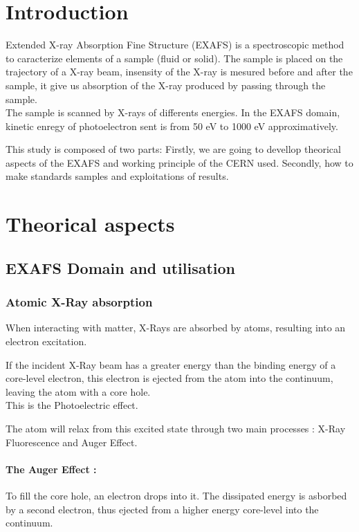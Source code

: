 \documentclass[11pt,a4paper,oneside]{article}
\begin{document}


\section*{Introduction}

Extended X-ray Absorption Fine Structure (EXAFS) is a spectroscopic method to caracterize elements of a sample (fluid or solid). The sample is placed on the trajectory of a X-ray beam, insensity of the X-ray is mesured before and after the sample, it give us absorption of the X-ray produced by passing through the sample.\\
The sample is scanned by X-rays of differents energies. In the EXAFS domain, kinetic enregy of photoelectron sent is from 50 eV to 1000 eV approximatively.

This study is composed of two parts: Firstly, we are going to devellop theorical aspects of the EXAFS and working principle of the CERN used. Secondly, how to make standards samples and exploitations of results.




\newpage

\section{Theorical aspects}
\subsection{EXAFS Domain and utilisation}
\subsubsection{Atomic X-Ray absorption}
When interacting with matter, X-Rays are absorbed by atoms, resulting into an electron excitation.

If the incident X-Ray beam has a greater energy than the binding energy of a core-level electron, this electron is ejected from the atom into the continuum, leaving the atom with a core hole.\\This is the Photoelectric effect.

The atom will relax from this excited state through two main processes : X-Ray Fluorescence and Auger Effect.

\paragraph{The Auger Effect :} To fill the core hole, an electron drops into it. The dissipated energy is asborbed by a second electron, thus ejected from a higher energy core-level into the continuum.
\end{document}

